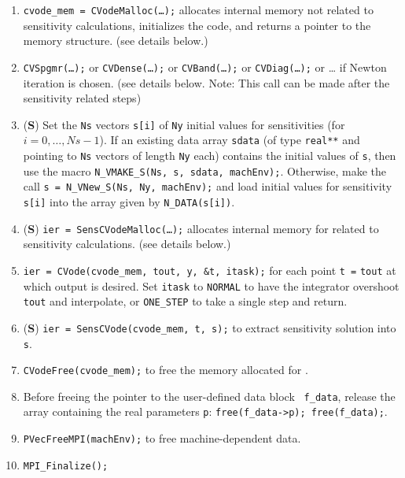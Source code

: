 \begin{enumerate}
\item
{\tt cvode\_mem = CVodeMalloc(\ldots);} allocates internal
memory  not related to sensitivity calculations, 
initializes the code, and returns a pointer to the {\codeS} memory structure. 
(see details below.)

\item \label{StepLinSolver}
{\tt CVSpgmr(\ldots);} or {\tt CVDense(\ldots);} or {\tt CVBand(\ldots);} 
or {\tt CVDiag(\ldots);} or \ldots
if Newton iteration is chosen. (see details below. Note: This call can be made after 
the sensitivity related steps)


\item
({\bf S}) Set the {\tt Ns} vectors {\tt s[i]} of {\tt Ny} initial values
for sensitivities (for $i=0,\ldots,Ns-1$). 
If an existing data array {\tt sdata} (of type {\tt real**} and pointing to
{\tt Ns} vectors of length {\tt Ny} each) contains the initial values of
{\tt s}, then use the macro {\tt N\_VMAKE\_S(Ns, s, sdata, machEnv);}.
Otherwise, make the call {\tt s = N\_VNew\_S(Ns, Ny, machEnv);} and load
initial values for sensitivity {\tt s[i]} into the array given by
{\tt N\_DATA(s[i])}.

\item
({\bf S}) {\tt ier = SensCVodeMalloc(\ldots);} allocates internal
memory for {\codeS} related to sensitivity calculations.
(see details below.) 

\item 
{\tt ier = CVode(cvode\_mem, tout, y, \&t, itask);} for each point
{\tt t =} {\tt tout} at which output is desired.
Set {\tt itask} to {\tt NORMAL} to have the integrator overshoot {\tt
tout} and interpolate, or {\tt ONE\_STEP} to take a single step and
return.

\item
({\bf S}) {\tt ier = SensCVode(cvode\_mem, t, s);} to extract
sensitivity solution into {\tt s}.

\item 
{\tt CVodeFree(cvode\_mem);} to free the memory allocated for {\codeS}.

\item
Before freeing the pointer to the user-defined data block {\tt
f\_data}, release the array containing the real parameters {\tt p}:
{\tt free(f\_data->p); free(f\_data);}.

\item 
{\tt PVecFreeMPI(machEnv);} to free machine-dependent data.

\item
{\tt MPI\_Finalize();}

\end{enumerate}

